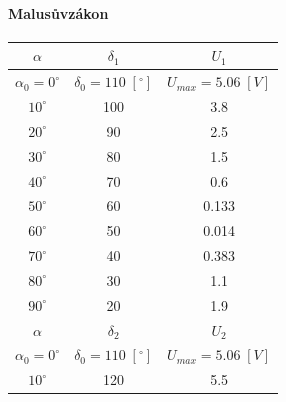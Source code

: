 \documentclass{article}
\begin{document}
\begin{figure}[H]
	\begin{minipage}[t]{0.35\textwidth}
        \paragraph*{Malusův\;zákon}
        \vspace*{-100mm}
        \begin{tabular}{|c|c|c|}
            \hline
            \(\alpha\)              & \(\delta_1\)                  & \(U_1\)                   \\ \hline
            \(\alpha_0 = 0^\circ\)  & \(\delta_0 = 110\;[^\circ]\)  & \(U_{max} = 5.06\;[V]\)   \\ \hline
            \(10^\circ\)            & 100                           & 3.8                       \\ \hline
            \(20^\circ\)            & 90                            & 2.5                       \\ \hline
            \(30^\circ\)            & 80                            & 1.5                       \\ \hline
            \(40^\circ\)            & 70                            & 0.6                       \\ \hline
            \(50^\circ\)            & 60                            & 0.133                     \\ \hline
            \(60^\circ\)            & 50                            & 0.014                     \\ \hline
            \(70^\circ\)            & 40                            & 0.383                     \\ \hline
            \(80^\circ\)            & 30                            & 1.1                       \\ \hline
            \(90^\circ\)            & 20                            & 1.9                       \\ \hline
                                                                                                   \hline
            \(\alpha\)              & \(\delta_2\)                  & \(U_2\)                   \\ \hline
            \(\alpha_0 = 0^\circ\)  & \(\delta_0 = 110\;[^\circ]\)  & \(U_{max} = 5.06\;[V]\)   \\ \hline
            \(10^\circ\)            & 120                           & 5.5                       \\ \hline

\end{tabular}
\end{minipage}
\end{figure}
\end{document}
